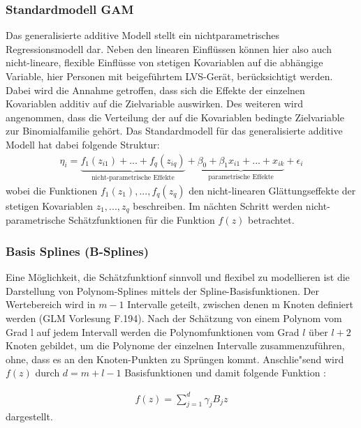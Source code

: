 \documentclass[12pt]{article}
\begin{document}
	\subsubsection{Standardmodell GAM}
	Das generalisierte additive Modell stellt ein nichtparametrisches Regressionsmodell dar.
	Neben den linearen Einﬂüssen können hier also auch nicht-lineare, flexible Einflüsse von stetigen Kovariablen auf die abhängige Variable, hier Personen mit beigeführtem LVS-Gerät, berücksichtigt werden. Dabei wird die Annahme getroffen, dass sich die Effekte der einzelnen Kovariablen additiv auf die Zielvariable auswirken. Des weiteren wird angenommen, dass die Verteilung der auf die Kovariablen bedingte Zielvariable zur Binomialfamilie gehört.
	Das Standardmodell für das generalisierte additive Modell hat dabei 
	folgende Struktur: \\
	\begin{align} 
	\eta_{i}=\underbrace{f_{1}(z_{i1})+...+f_{q}(z_{iq})}_{\text{nicht-parametrische Effekte}}+\underbrace{\beta_{0}+\beta_{1}x_{i1}+...+x_{ik}}_{\text{parametrische Effekte}}+\epsilon_{i}
	\end{align}
	wobei die Funktionen $f_{1}(z_{1}),...,f_{q}(z_{q})$ den nicht-linearen Glättungseffekte der stetigen  Kovariablen $z_{1},...,z_{q}$ beschreiben. Im nächten Schritt werden nicht-parametrische Schätzfunktionen für die Funktion $f(z)$ betrachtet.
	
	\subsubsection{Basis Splines (B-Splines)}
	Eine Möglichkeit, die Schätzfunktionf sinnvoll und flexibel zu modellieren ist die Darstellung von Polynom-Splines mittels der Spline-Basisfunktionen. Der Wertebereich wird in $m-1$ Intervalle geteilt, zwischen denen m Knoten definiert werden (GLM Vorlesung F.194). Nach der Schätzung von einem Polynom vom Grad l auf jedem Intervall werden die Polynomfunktionen vom Grad $l$ über $l + 2$ Knoten gebildet, um die Polynome der einzelnen Intervalle zusammenzuführen, ohne, dass es an den Knoten-Punkten zu Sprüngen kommt. Anschlie"send wird $f(z)$ durch $d = m+l-1$ Basisfunktionen und damit folgende Funktion :
	
	\begin{align}
	f(z)=\sum_{j=1}^d\gamma_{j}B_{j}z
	\end{align}
	dargestellt.
	
\end{document}
